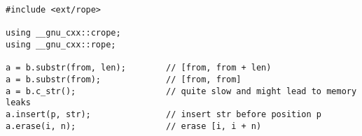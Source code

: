 \begin{lstlisting}
﻿#include <ext/rope>

using __gnu_cxx::crope;
using __gnu_cxx::rope;

a = b.substr(from, len);        // [from, from + len)
a = b.substr(from);             // [from, from]
a = b.c_str();                  // quite slow and might lead to memory leaks
a.insert(p, str);               // insert str before position p
a.erase(i, n);                  // erase [i, i + n)

\end{lstlisting}